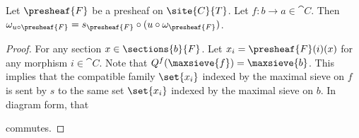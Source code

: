 \begin{lemma}
Let $\presheaf{F}$ be a presheaf on $\site{C}{T}$.
Let $f:b\rightarrow a \in \cat{C}$.
Then $\omega_{u\circ \presheaf{F}} = s_{\presheaf{F}} \circ (u\circ\omega_{\presheaf{F}})$.
\end{lemma}

\begin{proof}
For any section $x \in \sections{b}{F}$.
Let $x_i = \presheaf{F}(i)(x)$ for any morphism $i \in \cat{C}$. 
Note that $Q^f(\maxsieve{f}) = \maxsieve{b}$.
This implies that the compatible family $\set{x_i}$ indexed by the maximal sieve on $f$
is sent by $s$ to the same set $\set{x_i}$ indexed by the maximal sieve on $b$.
In diagram form, that

\begin{center}
\end{center}

commutes.
\end{proof}